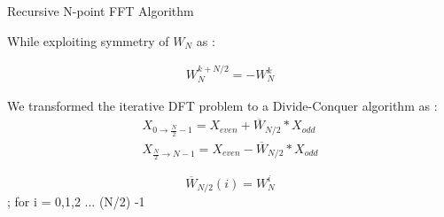 \documentclass[notheorems]{beamer}
\begin{document}
\begin{frame}{Recursive N-point FFT Algorithm   }

While exploiting symmetry of $W_{N}$ as :

\begin{align}
  W_{N}^{k+N/2} = -W_{N}^k  
\end{align}

We transformed  the  iterative DFT problem  to a Divide-Conquer algorithm as :
\begin{align}
    X_{0\rightarrow \frac{N}{2}-1} = X_{even} + \overline{W}_{N/2}* X_{odd} \\
    X_{\frac{N}{2}\rightarrow N-1} = X_{even} - \overline{W}_{N/2} * X_{odd} 
\end{align}

 $$\overline{W}_{N/2}(i) = W_{N}^i $$;  for i = 0,1,2 ... (N/2) -1 \bigskip\\
\end{frame}
\end{document}
